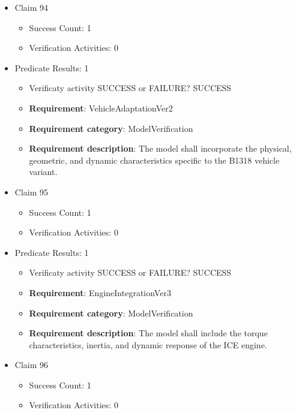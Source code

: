 \documentclass{article}
\begin{document}
\begin{itemize}
  				  \item Claim 94
				\begin{itemize}
			    	\item Success Count: 1 
			    	\item Verification Activities: 0
				\end{itemize}
				
									    
				\item Predicate Results: 1
					\begin{itemize}				
					\item Verificaty activity SUCCESS or FAILURE? SUCCESS
					
					\item \textbf{Requirement}: VehicleAdaptationVer2 
					\item \textbf{Requirement category}: ModelVerification
					\item \textbf{Requirement description}: The model shall incorporate the physical, geometric, and dynamic characteristics specific to the B1318 vehicle variant.
					\end{itemize}

  				  \item Claim 95
				\begin{itemize}
			    	\item Success Count: 1 
			    	\item Verification Activities: 0
				\end{itemize}
				
									    
				\item Predicate Results: 1
					\begin{itemize}				
					\item Verificaty activity SUCCESS or FAILURE? SUCCESS
					
					\item \textbf{Requirement}: EngineIntegrationVer3 
					\item \textbf{Requirement category}: ModelVerification
					\item \textbf{Requirement description}: The model shall include the torque characteristics, inertia, and dynamic response of the ICE engine.
					\end{itemize}

  				  \item Claim 96
				\begin{itemize}
			    	\item Success Count: 1 
			    	\item Verification Activities: 0
				\end{itemize}
				

\end{itemize}
\end{document}

